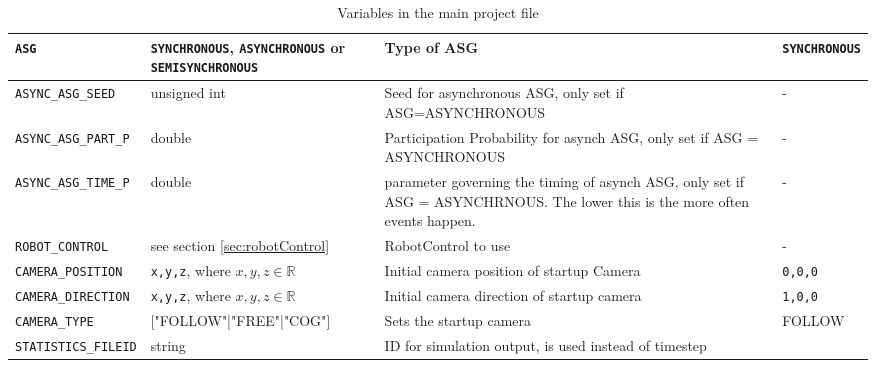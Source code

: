 \begin{sidewaystable}
\begin{tabular}{|l|p{}|p{}|p{}|}
		\texttt{ASG} & \texttt{SYNCHRONOUS}, \texttt{ASYNCHRONOUS} or \texttt{SEMISYNCHRONOUS} & Type of ASG & \texttt{SYNCHRONOUS}\\\hline
		  \texttt{ASYNC\_ASG\_SEED} & unsigned int & Seed for asynchronous ASG, only set if ASG=ASYNCHRONOUS & - \\\hline
		    \texttt{ASYNC\_ASG\_PART\_P} & double & Participation Probability for asynch ASG, only set if ASG = ASYNCHRONOUS & - \\\hline
		 \texttt{ASYNC\_ASG\_TIME\_P} & double & parameter governing the timing of asynch ASG, only set if ASG = ASYNCHRNOUS. The lower this is the more often events happen. & - \\\hline
		 
		\texttt{ROBOT\_CONTROL} &  see section \ref{sec:robotControl} & RobotControl to use & -\\\hline
		\texttt{CAMERA\_POSITION} &  \texttt{x,y,z}, where $x,y,z\in\mathbb{R}$& Initial camera position of startup Camera & \texttt{0,0,0}\\\hline
		\texttt{CAMERA\_DIRECTION} &  \texttt{x,y,z}, where $x,y,z\in\mathbb{R}$& Initial camera direction of startup camera & \texttt{1,0,0}\\\hline
		\texttt{CAMERA\_TYPE} &  $[$"FOLLOW"|"FREE"|"COG"$]$& Sets the startup camera& FOLLOW\\\hline
		\texttt{STATISTICS\_FILEID} & string & ID for simulation output, is used instead of timestep\\\hline
	\end{tabular}
	\caption{Variables in the main project file}\label{tab:mainvars}
\end{sidewaystable}
\thispagestyle{empty}
\clearpage

